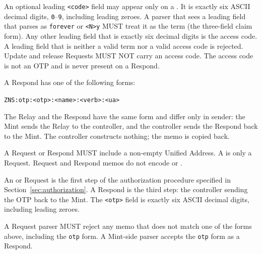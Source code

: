 An optional leading \texttt{<code>} field may appear only on a . It is exactly six ASCII decimal digits, \texttt{0}--\texttt{9}, including leading zeroes. A parser that sees a leading field that parses as \texttt{forever} or \texttt{<N>y} MUST treat it as the term (the three-field claim form). Any other leading field that is exactly six decimal digits is the access code. A leading field that is neither a valid term nor a valid access code is rejected. Update and release Requests MUST NOT carry an access code. The access code is not an OTP and is never present on a Respond.

A Respond has one of the following forms:

\begin{center}
\texttt{ZNS:otp:<otp>:<name>:<verb>:<ua>}
\end{center}

The Relay and the Respond have the same form and differ only in sender: the Mint sends the Relay to the controller, and the controller sends the Respond back to the Mint. The controller constructs nothing; the memo is copied back.

A Request or Respond MUST include a non-empty Unified Address. A  is only a Request. Request and Respond memos do not encode  or .

An  or  Request is the first step of the authorization procedure specified in Section~\ref{sec:authorization}. A Respond is the third step: the controller sending the OTP back to the Mint. The \texttt{<otp>} field is exactly six ASCII decimal digits, including leading zeroes.

A Request parser MUST reject any memo that does not match one of the forms above, including the \texttt{otp} form. A Mint-side parser accepts the \texttt{otp} form as a Respond.
